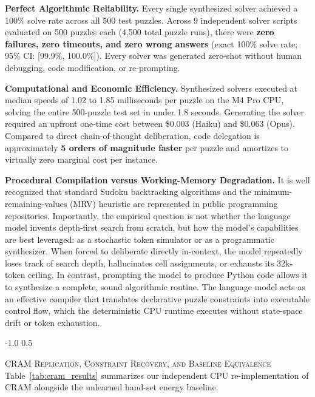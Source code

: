 \documentclass{article} %
\makeatletter
\renewcommand{\subsection}{\@startsection{subsection}{2}{\z@}%
  {-1.0\baselineskip}%
  {0.5\baselineskip}%
  {\normalfont\fontsize{10pt}{12pt}\selectfont\scshape\raggedright}}
\makeatother
\begin{document}
\textbf{Perfect Algorithmic Reliability.} Every single synthesized solver achieved a 100\% solve rate across all 500 test puzzles. Across 9 independent solver scripts evaluated on 500 puzzles each (4,500 total puzzle runs), there were \textbf{zero failures, zero timeouts, and zero wrong answers} (exact 100\% solve rate; 95\% CI: [99.9\%, 100.0\%]). Every solver was generated zero-shot without human debugging, code modification, or re-prompting.

\textbf{Computational and Economic Efficiency.} Synthesized solvers executed at median speeds of 1.02 to 1.85 milliseconds per puzzle on the M4 Pro CPU, solving the entire 500-puzzle test set in under 1.8 seconds. Generating the solver required an upfront one-time cost between \$0.003 (Haiku) and \$0.063 (Opus). Compared to direct chain-of-thought deliberation, code delegation is approximately \textbf{5 orders of magnitude faster} per puzzle and amortizes to virtually zero marginal cost per instance.

\textbf{Procedural Compilation versus Working-Memory Degradation.} It is well recognized that standard Sudoku backtracking algorithms and the minimum-remaining-values (MRV) heuristic are represented in public programming repositories. Importantly, the empirical question is not whether the language model invents depth-first search from scratch, but how the model's capabilities are best leveraged: as a stochastic token simulator or as a programmatic synthesizer. When forced to deliberate directly in-context, the model repeatedly loses track of search depth, hallucinates cell assignments, or exhausts its 32k-token ceiling. In contrast, prompting the model to produce Python code allows it to synthesize a complete, sound algorithmic routine. The language model acts as an effective compiler that translates declarative puzzle constraints into executable control flow, which the deterministic CPU runtime executes without state-space drift or token exhaustion.

\subsection{\textsc{CRAM Replication, Constraint Recovery, and Baseline Equivalence}}
Table~\ref{tab:cram_results} summarizes our independent CPU re-implementation of CRAM alongside the unlearned hand-set energy baseline.
\end{document}
